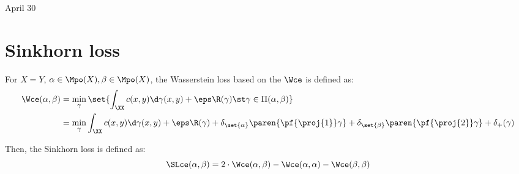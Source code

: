 \documentclass[11pt,a4paper]{article}
\begin{document}

{\Huge April 30}

\section*{Sinkhorn loss}

For $X=Y$, $\alpha \in \Mpo(X), \beta \in \Mpo(X)$, the Wasserstein loss based on the $\Wce$ is defined as:
\begin{align}
    \label{eqn:wasserstein-loss}
    \Wce(\alpha, \beta) &= \min_{\gamma} \set{ \int_{\XX} c(x, y) \d \gamma(x, y) + \eps \R(\gamma) \st \gamma \in \Pi(\alpha, \beta)} \\
                        &= \min_{\gamma} \int_{\XX} c(x, y) \d \gamma(x, y) + \eps \R(\gamma) + \delta_{\set{\alpha}}\paren{ \pf{\proj{1}}\gamma } + \delta_{\set{\beta}}\paren{\pf{\proj{2}}\gamma} + \delta_{+}(\gamma)
\end{align}

Then, the Sinkhorn loss is defined as:
\begin{equation}
    \SLce(\alpha, \beta) = 2\cdot \Wce(\alpha, \beta) - \Wce(\alpha, \alpha) - \Wce(\beta, \beta)
\end{equation}
\end{document}
